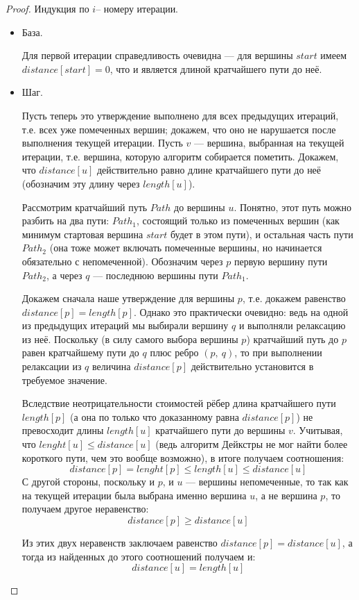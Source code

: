 \documentclass[a4paper,12pt]{article}
\begin{document}
\begin{proof}
    Индукция по $i$-- номеру итерации.
    \begin{itemize}
        \item База.
        
        Для первой итерации справедливость очевидна — для вершины $start$ имеем $distance[start]=0$, что и является длиной кратчайшего пути до неё.
        
        \item Шаг.
        
        Пусть теперь это утверждение выполнено для всех предыдущих итераций, т.е. всех уже помеченных вершин; докажем, что оно не нарушается после выполнения текущей итерации. Пусть $v$ — вершина, выбранная на текущей итерации, т.е. вершина, которую алгоритм собирается пометить. Докажем, что $distance[u]$ действительно равно длине кратчайшего пути до неё (обозначим эту длину через $length[u]$).
        
        Рассмотрим кратчайший путь $Path$ до вершины $u$. Понятно, этот путь можно разбить на два пути: $Path_1$, состоящий только из помеченных вершин (как минимум стартовая вершина $start$ будет в этом пути), и остальная часть пути $Path_2$ (она тоже может включать помеченные вершины, но начинается обязательно с непомеченной). Обозначим через $p$ первую вершину пути $Path_2$, а через $q$ — последнюю вершины пути $Path_1$.
        
        Докажем сначала наше утверждение для вершины $p$, т.е. докажем равенство $distance[p] = length[p]$. Однако это практически очевидно: ведь на одной из предыдущих итераций мы выбирали вершину $q$ и выполняли релаксацию из неё. Поскольку (в силу самого выбора вершины $p$) кратчайший путь до $p$ равен кратчайшему пути до $q$ плюс ребро $(p,\ q)$, то при выполнении релаксации из $q$ величина $distance[p]$ действительно установится в требуемое значение.
        
        
        Вследствие неотрицательности стоимостей рёбер длина кратчайшего пути $length[p]$ (а она по только что доказанному равна $distance[p]$) не превосходит длины $length[u]$ кратчайшего пути до вершины $v$. Учитывая, что $lenght[u] \leq distance[u]$ (ведь алгоритм Дейкстры не мог найти более короткого пути, чем это вообще возможно), в итоге получаем соотношения:\[ distance[p] = lenght[p] \leq length[u] \leq distance[u]\]
        С другой стороны, поскольку и $p$, и $u$ — вершины непомеченные, то так как на текущей итерации была выбрана именно вершина $u$, а не вершина $p$, то получаем другое неравенство:\[ distance[p] \geq distance[u]\] 

        Из этих двух неравенств заключаем равенство $distance[p] = distance[u]$, а тогда из найденных до этого соотношений получаем и:\[ distance[u] = length[u]\] 
    \end{itemize}
    
\end{proof}
\end{document}
